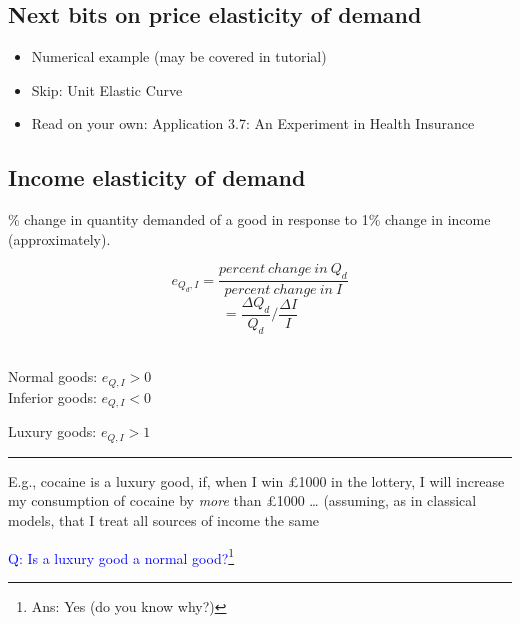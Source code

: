 \documentclass[]{article}
\providecommand{\tightlist}{%
  \setlength{\itemsep}{0pt}\setlength{\parskip}{0pt}}
\begin{document}
\hypertarget{next-bits-on-price-elasticity-of-demand}{%
\subsection{Next bits on price elasticity of
demand}\label{next-bits-on-price-elasticity-of-demand}}

\begin{itemize}
\tightlist
\item
  Numerical example (may be covered in tutorial)
\item
  Skip: Unit Elastic Curve
\item
  Read on your own: Application 3.7: An Experiment in Health Insurance
\end{itemize}

\hypertarget{income-elasticity-of-demand}{%
\subsection{Income elasticity of
demand}\label{income-elasticity-of-demand}}

\begin{description}
\tightlist
\item[Income elasticity of demand]
\% change in quantity demanded of a good in response to 1\% change in
income (approximately).
\end{description}

\[e_{Q_d,I} = \frac{percent \ change \ in \ Q_d}{percent \ change \ in \ I} \]
\[  = \frac{\Delta Q_d}{Q_d}/\frac{\Delta I}{I}\]\\

\bigskip

Normal goods: \(e_{Q,I} > 0\)\\

Inferior goods: \(e_{Q,I} < 0\)

\bigskip

Luxury goods: \(e_{Q,I} > 1\)

\begin{center}\rule{0.5\linewidth}{\linethickness}\end{center}

E.g., cocaine is a luxury good, if, when I win £1000 in the lottery, I
will increase my consumption of cocaine by \emph{more} than £1000
\ldots{} (assuming, as in classical models, that I treat all sources of
income the same

\textcolor{blue}{Q: Is a luxury good a normal good?}\footnote{Ans: Yes
  (do you know why?)}
\end{document}
